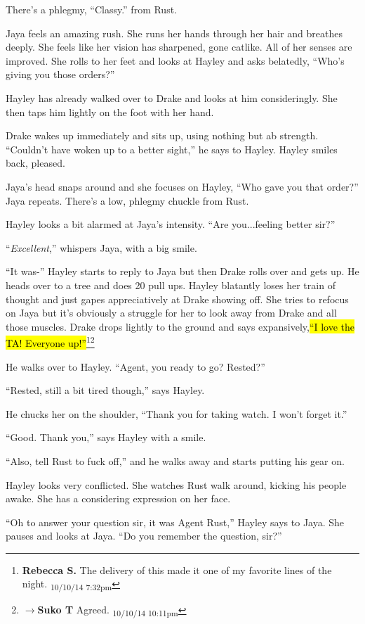 There's a phlegmy, ``Classy.'' from Rust.

Jaya feels an amazing rush.  She runs her hands through her hair and breathes deeply.  She feels like her vision has sharpened, gone catlike.  All of her senses are improved.  She rolls to her feet and looks at Hayley and asks belatedly, ``Who's giving you those orders?''

Hayley has already walked over to Drake and looks at him consideringly.  She then taps him lightly on the foot with her hand.

Drake wakes up immediately and sits up, using nothing but ab strength.  ``Couldn't have woken up to a better sight,'' he says to Hayley.  Hayley smiles back, pleased.

Jaya's head snaps around and she focuses on Hayley, ``Who gave you that order?'' Jaya repeats.  There's a low, phlegmy chuckle from Rust.

Hayley looks a bit alarmed at Jaya's intensity.  ``Are you...feeling better sir?''

``\textit{Excellent},'' whispers Jaya, with a big smile.

``It was-'' Hayley starts to reply to Jaya but then Drake rolls over and gets up.  He heads over to a tree and does 20 pull ups.  Hayley blatantly loses her train of thought and just gapes appreciatively at Drake showing off.  She tries to refocus on Jaya but it's obviously a struggle for her to look away from Drake and all those muscles.  Drake drops lightly to the ground and says expansively,\hl{``I love the TA!  Everyone up!''}\footnote{\textbf{Rebecca S. }The delivery of this made it one of my favorite lines of the night. \textsubscript{10/10/14 7:32pm}}\footnote{$\rightarrow$\textbf{Suko T }Agreed. \textsubscript{10/10/14 10:11pm}}

He walks over to Hayley.  ``Agent, you ready to go?  Rested?''

``Rested, still a bit tired though,'' says Hayley.

He chucks her on the shoulder,  ``Thank you for taking watch. I won't forget it.''

``Good.  Thank you,'' says Hayley with a smile.

``Also, tell Rust to fuck off,'' and he walks away and starts putting his gear on.

Hayley looks very conflicted.  She watches Rust walk around, kicking his people awake.  She has a considering expression on her face.

``Oh to answer your question sir, it was Agent Rust,'' Hayley says to Jaya.  She pauses and looks at Jaya.  ``Do you remember the question, sir?''


